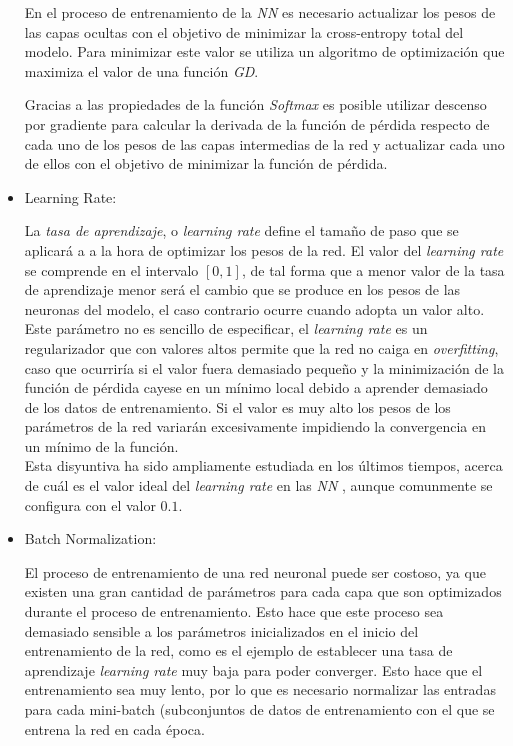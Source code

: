 \begin{itemize}
                    En el proceso de entrenamiento de la \textit{NN} es necesario actualizar los pesos de las capas ocultas con el objetivo de minimizar la cross-entropy total del modelo. Para minimizar este valor se utiliza un algoritmo de optimización que maximiza el valor de una función \textit{GD}.

                    Gracias a las propiedades de la función \textit{Softmax} es posible utilizar descenso por gradiente para calcular la derivada de la función de pérdida respecto de cada uno de los pesos de las capas intermedias de la red y actualizar cada uno de ellos con el objetivo de minimizar la función de pérdida.

                \item Learning Rate:

                    La \textit{tasa de aprendizaje}, o \textit{learning rate} define el tamaño de paso que se aplicará a a la hora de optimizar los pesos de la red. El valor del \textit{learning rate} se comprende en el intervalo $[0,1]$, de tal forma que a menor valor de la tasa de aprendizaje menor será el cambio que se produce en los pesos de las neuronas del modelo, el caso contrario ocurre cuando adopta un valor alto.\\



                    Este parámetro no es sencillo de especificar, el \textit{learning rate} es un regularizador que con valores altos permite que la red no caiga en \textit{overfitting}, caso que ocurriría si el valor fuera demasiado pequeño y la minimización de la función de pérdida cayese en un mínimo local debido a aprender demasiado de los datos de entrenamiento. Si el valor es muy alto los pesos de los parámetros de la red variarán excesivamente impidiendo la convergencia en un mínimo de la función.\\

                    Esta disyuntiva ha sido ampliamente estudiada en los últimos tiempos, acerca de cuál es el valor ideal del \textit{learning rate} en las \textit{NN} \cite{LearningRate}, aunque comunmente se configura con el valor $0.1$.



                \item Batch Normalization:

                    El proceso de entrenamiento de una red neuronal puede ser costoso, ya que existen una gran cantidad de parámetros para cada capa que son optimizados durante el proceso de entrenamiento. Esto hace que este proceso sea demasiado sensible a los parámetros inicializados en el inicio del entrenamiento de la red, como es el ejemplo de establecer una tasa de aprendizaje \textit{learning rate} muy baja para poder converger. Esto hace que el entrenamiento sea muy lento, por lo que es necesario normalizar las entradas para cada mini-batch (subconjuntos de datos de entrenamiento con el que se entrena la red en cada época.\\



\end{itemize}
